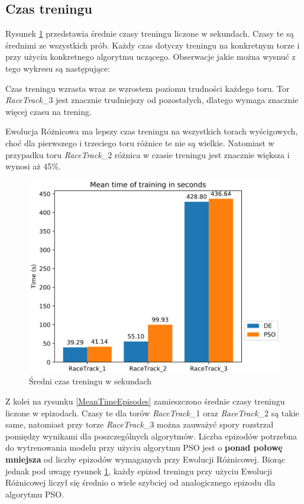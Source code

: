 \vspace{2cm}
\subsection{Czas treningu}
Rysunek \ref{MeanTimeSeconds} przedstawia średnie czasy treningu liczone w sekundach. Czasy te są średnimi ze wszystkich prób. Każdy czas dotyczy treningu na konkretnym torze i przy użyciu konkretnego algorytmu uczącego. Obserwacje jakie można wysnuć z tego wykresu są następujące:
\begin{enumerate*}
\item Czas treningu wzrasta wraz ze wzrostem poziomu trudności każdego toru. Tor \textit{RaceTrack}\_3 jest znacznie trudniejszy od pozostałych, dlatego wymaga znacznie więcej czasu na trening.
\item Ewolucja Różnicowa ma lepszy czas treningu na wszystkich torach wyścigowych, choć dla pierwszego i trzeciego toru różnice te nie są wielkie. Natomiast w przypadku toru \textit{RaceTrack}\_2 różnica w czasie treningu jest znacznie większa i wynosi aż 45\%.
\end{enumerate*}
\vspace{1cm}
\begin{figure}[H]
\centering
\includegraphics[width=15cm]{resources/figures/train_time_seconds.png}
\caption{Średni czas treningu w sekundach}
\label{MeanTimeSeconds}
\end{figure}

Z kolei na rysunku \ref{MeanTimeEpisodes} zamieszczono średnie czasy treningu liczone w epizodach. Czasy te dla torów \textit{RaceTrack}\_1 oraz \textit{RaceTrack}\_2 są takie same, natomiast przy torze \textit{RaceTrack}\_3 można zauważyć spory rozstrzał pomiędzy wynikami dla poszczególnych algorytmów. Liczba epizodów potrzebna do wytrenowania modelu przy użyciu algorytmu PSO jest o \textbf{ponad połowę mniejsza} od liczby epizodów wymaganych przy Ewolucji Różnicowej. Biorąc jednak pod uwagę rysunek \ref{MeanTimeSeconds}, każdy epizod treningu przy użyciu Ewolucji Różnicowej liczył się średnio o wiele szybciej od analogicznego epizodu dla algorytmu PSO.

